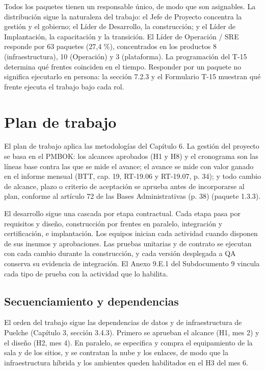 
Todos los paquetes tienen un responsable único, de modo que son asignables. La distribución sigue la naturaleza del trabajo: el Jefe de Proyecto concentra la gestión y el gobierno; el Líder de Desarrollo, la construcción; y el Líder de Implantación, la capacitación y la transición. El Líder de Operación / SRE responde por 63 paquetes (27,4 \%), concentrados en los productos 8 (infraestructura), 10 (Operación) y 3 (plataforma). La programación del T-15 determina qué frentes coinciden en el tiempo. Responder por un paquete no significa ejecutarlo en persona: la sección 7.2.3 y el Formulario T-15 muestran qué frente ejecuta el trabajo bajo cada rol.

\section{Plan de trabajo}

El plan de trabajo aplica las metodologías del Capítulo 6. La gestión del proyecto se basa en el PMBOK: los alcances aprobados (H1 y H8) y el cronograma son las líneas base contra las que se mide el avance; el avance se mide con valor ganado en el informe mensual (BTT, cap. 19, RT-19.06 y RT-19.07, p. 34); y todo cambio de alcance, plazo o criterio de aceptación se aprueba antes de incorporarse al plan, conforme al artículo 72 de las Bases Administrativas (p. 38) (paquete 1.3.3).

El desarrollo sigue una cascada por etapa contractual. Cada etapa pasa por requisitos y diseño, construcción por frentes en paralelo, integración y certificación, e implantación. Los equipos inician cada actividad cuando disponen de sus insumos y aprobaciones. Las pruebas unitarias y de contrato se ejecutan con cada cambio durante la construcción, y cada versión desplegada a QA conserva su evidencia de integración. El Anexo 9.E.1 del Subdocumento 9 vincula cada tipo de prueba con la actividad que lo habilita.

\subsection{Secuenciamiento y dependencias}

El orden del trabajo sigue las dependencias de datos y de infraestructura de Puelche (Capítulo 3, sección 3.4.3). Primero se aprueban el alcance (H1, mes 2) y el diseño (H2, mes 4). En paralelo, se especifica y compra el equipamiento de la sala y de los sitios, y se contratan la nube y los enlaces, de modo que la infraestructura híbrida y los ambientes queden habilitados en el H3 del mes 6.

